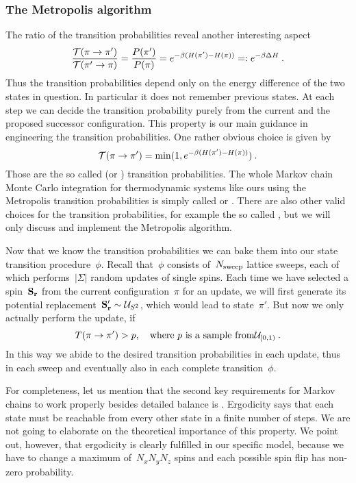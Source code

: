 \subsubsection{The Metropolis algorithm}

The ratio of the transition probabilities reveal another interesting
aspect
%
\begin{equation}
  \frac{\mathcal{T}(\pi \to \pi')}{\mathcal{T}(\pi' \to \pi)} = \frac{P(\pi')}{P(\pi)} =
  e^{-\beta (H(\pi') - H(\pi))} =: e^{-\beta \Delta H}\:.
\end{equation}
%
Thus the transition probabilities depend only on the energy difference of the
two states in question. In particular it does not remember previous states. At
each step we can decide the transition probability purely from the current and
the proposed successor configuration. This property is our main guidance in
engineering the transition probabilities. One rather obvious choice is given by
%
\begin{equation}
  \mathcal{T}(\pi \to \pi') = \min(1, e^{-\beta (H(\pi') - H(\pi))})\:.
\end{equation}
%
Those are the so called  (or )
transition probabilities. The whole Markov chain Monte Carlo integration for
thermodynamic systems like ours using the Metropolis transition probabilities is
simply called  or . There are also other valid choices for the transition probabilities,
for example the so called , but we will only discuss
and implement the Metropolis algorithm.

Now that we know the transition probabilities we can bake them into our state
transition procedure~$\phi$. Recall that~$\phi$ consists of~$N_{\mathrm{sweep}}$ lattice
sweeps, each of which performs~$|\Sigma|$ random updates of single spins. Each
time we have selected a spin~$\mathbf{S}_{\mathbf{r}}$ from the current configuration~$\pi$ for
an update, we will first generate its potential replacement~$\mathbf{S}'_{\mathbf{r}} \sim
\mathcal{U}_{S^2}$, which would lead to state~$\pi'$. But now we only actually perform
the update, if
%
\begin{equation}
  T(\pi \to \pi') > p, \quad \text{where } p
    \text{ is a sample from} \mathcal{U}_{[0,1)}\:.
\end{equation}
%
In this way we abide to the desired transition probabilities in each update,
thus in each sweep and eventually also in each complete transition~$\phi$.

For completeness, let us mention that the second key requirements for Markov
chains to work properly besides detailed balance is .
Ergodicity says that each state must be reachable from every other state in a
finite number of steps. We are not going to elaborate on the theoretical
importance of this property. We point out, however, that ergodicity is clearly
fulfilled in our specific model, because we have to change a maximum of~$N_x N_y
N_z$ spins and each possible spin flip has non-zero probability.

